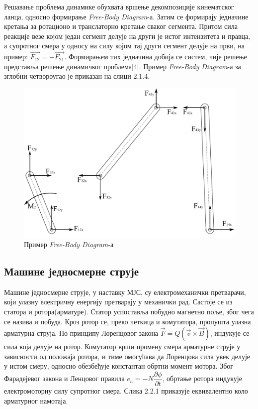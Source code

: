 \documentclass[12pt]{article}
\begin{document}
Решавање проблема динамике обухвата вршење декомпозиције кинематског ланца, односно формирање \textit{Free-Body Diagram}-а. Затим се формирају једначине кретања за ротационо и транслаторно кретање сваког сегмента. Притом сила реакције везе којом један сегмент делује на други је истог интензитета и правца, а супротног смера у односу на силу којом тај други сегмент делује на први, на пример: $\vec{F_{12}} = -\vec{F_{21}}$. Формирањем тих једначина добија се систем, чије решење представља решење динамичког проблема[4]. Пример \textit{Free-Body Diagram}-а за зглобни четвороугао је приказан на слици 2.1.4.

\begin{figure}[H]
    \centering
    \includegraphics[width=12cm]{figures/4bar_fbd.jpg}
    \caption{Пример \textit{Free-Body Diagram}-а}
    \label{fig:фбд_пример}
\end{figure}

\subsection{Машине једносмерне струје}
Машине једносмерне струје, у наставку МЈС, су електромеханички претварачи, који улазну електричну енергију претварају у механички рад. Састоје се из статора и ротора(арматуре). Статор успоставља побудно магнетно поље, због чега се назива и побуда. Кроз ротор се, преко четкица и комутатора, пропушта улазна арматурна струја. По принципу Лоренцовог закона $\vec F=Q(\vec v \times \vec B)$, индукује се сила која делује на ротор. Комутатор врши промену смера арматурне струје у зависности од положаја ротора, и тиме омогућава да Лоренцова сила увек делује у истом смеру, односно обезбеђује константан обртни момент мотора. Због Фарадејевог закона и Ленцовог правила $e_a=-N\dfrac{\partial\phi }{\partial t}$, обртање ротора индукује електромоторну силу супротног смера. Слика 2.2.1 приказује еквивалентно коло арматурног намотаја.
\end{document}
